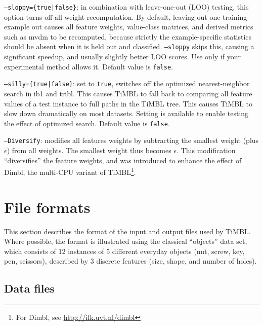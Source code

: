 \documentclass{report}
\begin{document}
\begin{description}
  \item {\tt --sloppy=\{true|false\}}: in combination with leave-one-out (LOO) testing, this option turns off all weight recomputation. By default, leaving out one training example out causes all feature weights, value-class matrices, and derived metrics such as {\sc mvdm} to be recomputed, because strictly the example-specific statistics should be absent when it is held out and classified. {\tt --sloppy} skips this, causing a significant speedup, and usually slightly better LOO scores. Use only if your experimental method allows it. Default value is {\tt false}.
  \item {\tt --silly=\{true|false\}}: set to {\tt true}, switches off the optimized nearest-neighbor search in {\sc ib1} and {\sc tribl}. This causes TiMBL to fall back to comparing all feature values of a test instance to full paths in the TiMBL tree. This causes TiMBL to slow down dramatically on most datasets. Setting is available to enable testing the effect of optimized search. Default value is {\tt false}.
  \item{\tt --Diversify}: modifies all features weights by subtracting the smallest weight (plus $\epsilon$) from all weights. The smallest weight thus becomes $\epsilon$. This modification ``diversifies'' the feature weights, and was introduced to enhance the effect of {\sc Dimbl}, the multi-CPU variant of TiMBL\footnote{For {\sc Dimbl}, see \url{http://ilk.uvt.nl/dimbl}}.
\end{description}

\section{File formats}
\label{fileformats}

This section describes the format of the input and output files used
by TiMBL. Where possible, the format is illustrated using the
classical ``objects'' data set, which consists of 12 instances of 5
different everyday objects (nut, screw, key, pen, scissors), described
by 3 discrete features (size, shape, and number of holes).

\subsection{Data files}
\label{dataformats}
\end{document}
